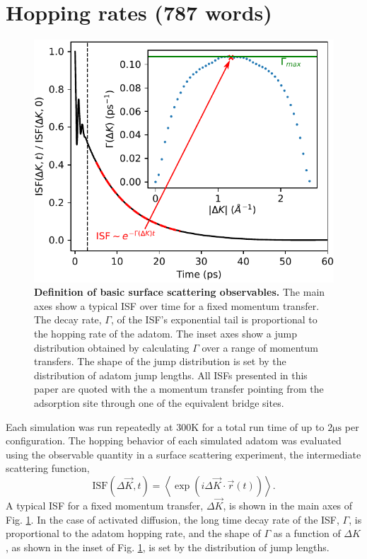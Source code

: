 \documentclass[7pt]{article}
\newcommand{\us}{\si{\micro\second}}
\newcommand{\K}{\si{\kelvin}}
\begin{document}
\section*{Hopping rates (787 words)}

\begin{figure}
	\centering
	\includegraphics[width=1.0\columnwidth]{isf_dk}
	\caption{\textbf{Definition of basic surface scattering observables.} The main axes show a typical ISF over time for a fixed momentum transfer. The decay rate, $\Gamma$, of the ISF's exponential tail is proportional to the hopping rate of the adatom. The inset axes show a jump distribution obtained by calculating $\Gamma$ over a range of momentum transfers. The shape of the jump distribution is set by the distribution of adatom jump lengths. All ISFs presented in this paper are quoted with the a momentum transfer pointing from the adsorption site through one of the equivalent bridge sites.} 
	\label{fig:isf_dk}
\end{figure}

Each simulation was run repeatedly at $300\K$ for a total run time of up to $2\us$ per configuration. The hopping behavior of each simulated adatom was evaluated using the observable quantity in a surface scattering experiment, the intermediate scattering function,
\begin{equation}
	\mathrm{ISF}(\Delta{\vec{K}}, t) = \left<\exp\left(i\Delta{\vec{K}}\cdot\vec{r}(t)\right)\right>.
\end{equation}
A typical ISF for a fixed momentum transfer, $\Delta{\vec{K}}$, is shown in the main axes of Fig. \ref{fig:isf_dk}. In the case of activated diffusion, the long time decay rate of the ISF, $\Gamma$, is proportional to the adatom hopping rate, and the shape of $\Gamma$ as a function of $\Delta{K}$, as shown in the inset of Fig. \ref{fig:isf_dk}, is set by the distribution of jump lengths\cite{Chudley, Diamant}.
\end{document}
